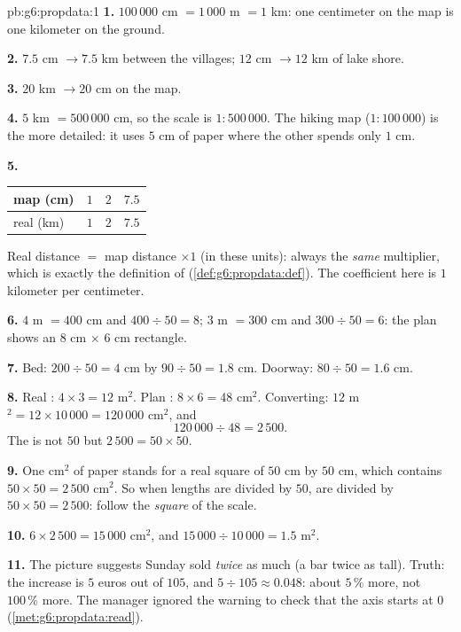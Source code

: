 \begin{solution}{pb:g6:propdata:1}
\textbf{1.} $100\,000$ cm $= 1\,000$ m $= 1$ km: one centimeter
on the map is one kilometer on the ground.

\textbf{2.} $7.5$ cm $\rightarrow 7.5$ km between the villages;
$12$ cm $\rightarrow 12$ km of lake shore.

\textbf{3.} $20$ km $\rightarrow 20$ cm on the map.

\textbf{4.} $5$ km $= 500\,000$ cm, so the scale is
$1:500\,000$. The hiking map ($1:100\,000$) is the more
detailed: it uses $5$ cm of paper where the other spends only
$1$ cm.

\textbf{5.}
\begin{center}
\renewcommand{\arraystretch}{1.2}
\begin{tabular}{l|ccc}
map (cm) & $1$ & $2$ & $7.5$ \\
\hline
real (km) & $1$ & $2$ & $7.5$ \\
\end{tabular}
\end{center}
Real distance $=$ map distance $\times 1$ (in these units):
always the \emph{same} multiplier, which is exactly the
definition of 
(\cref{def:g6:propdata:def}). The coefficient here is $1$
kilometer per centimeter.

\textbf{6.} $4$ m $= 400$ cm and $400 \div 50 = 8$;
$3$ m $= 300$ cm and $300 \div 50 = 6$: the plan shows an
$8$ cm $\times$ $6$ cm rectangle.

\textbf{7.} Bed: $200 \div 50 = 4$ cm by $90 \div 50 = 1.8$ cm.
Doorway: $80 \div 50 = 1.6$ cm.

\textbf{8.} Real : $4 \times 3 = 12$ m$^2$. Plan :
$8 \times 6 = 48$ cm$^2$. Converting:
$12$ m$^2 = 12 \times 10\,000 = 120\,000$ cm$^2$, and
\[
120\,000 \div 48 = 2\,500 .
\]
The  is not $50$ but $2\,500 = 50 \times 50$.

\textbf{9.} One cm$^2$ of paper stands for a real square of
$50$ cm by $50$ cm, which contains
$50 \times 50 = 2\,500$ cm$^2$. So when lengths are divided by
$50$,  are divided by $50 \times 50 = 2\,500$:  follow
the \emph{square} of the scale.

\textbf{10.} $6 \times 2\,500 = 15\,000$ cm$^2$, and
$15\,000 \div 10\,000 = 1.5$ m$^2$.

\textbf{11.} The picture suggests Sunday sold \emph{twice} as
much (a bar twice as tall). Truth: the increase is $5$ euros out
of $105$, and $5 \div 105 \approx 0.048$: about $5\,\%$ more,
not $100\,\%$ more. The manager ignored the warning to check
that the axis starts at $0$
(\cref{met:g6:propdata:read}).


\end{solution}
